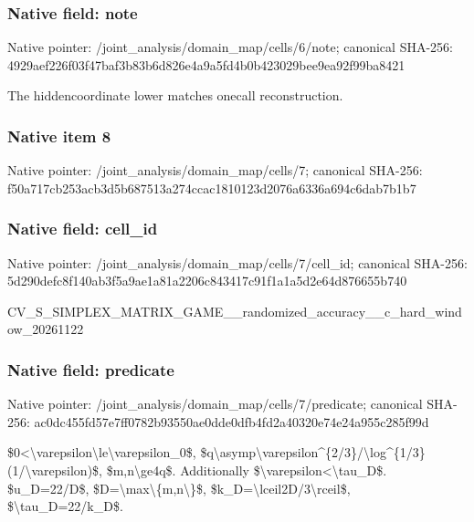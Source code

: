 \documentclass[10pt,a4paper]{article}
\begin{document}
\subsubsection{Native field: note}


Native pointer: /joint\_analysis/domain\_map/cells/6/note; canonical SHA-256: 4929aef226f03f47baf3b83b\allowbreak{}6d826e4a9a5fd4b0b423029b\allowbreak{}ee9ea92f99ba8421


The hiddencoordinate lower matches onecall reconstruction.


\subsubsection{Native item 8}


Native pointer: /joint\_analysis/domain\_map/cells/7; canonical SHA-256: f50a717cb253acb3d5b68751\allowbreak{}3a274ccac1810123d2076a63\allowbreak{}36a694c6dab7b1b7



\subsubsection{Native field: cell\_id}


Native pointer: /joint\_analysis/domain\_m\allowbreak{}ap/cells/7/cell\_id; canonical SHA-256: 5d290defc8f140ab3f5a9ae1\allowbreak{}a81a2206c843417c91f1a1a5\allowbreak{}d2e64d876655b740


CV\_S\_SIMPLEX\_MATRIX\_GAME\allowbreak{}\_\_randomized\_accuracy\_\_c\allowbreak{}\_hard\_window\_20261122


\subsubsection{Native field: predicate}


Native pointer: /joint\_analysis/domain\_m\allowbreak{}ap/cells/7/predicate; canonical SHA-256: ac0dc455fd57e7ff0782b935\allowbreak{}50ae0dde0dfb4fd2a40320e7\allowbreak{}4e24a955c285f99d


\$0<\textbackslash{}varepsilon\textbackslash{}le\textbackslash{}varepsilon\_0\$, \$q\textbackslash{}asymp\textbackslash{}varepsilon\textasciicircum{}\{2/\allowbreak{}3\}/\textbackslash{}log\textasciicircum{}\{1/3\}(1/\textbackslash{}varepsi\allowbreak{}lon)\$, \$m,n\textbackslash{}ge4q\$. Additionally \$\textbackslash{}varepsilon<\textbackslash{}tau\_D\$. \$u\_D=22/D\$, \$D=\textbackslash{}max\textbackslash{}\{m,n\textbackslash{}\}\$, \$k\_D=\textbackslash{}lceil2D/3\textbackslash{}rceil\$, \$\textbackslash{}tau\_D=22/k\_D\$.
\end{document}

